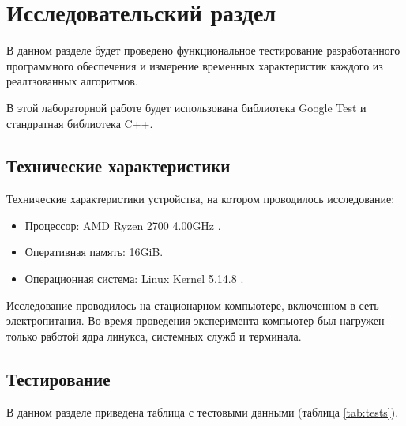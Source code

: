 \chapter{Исследовательский раздел}
В данном разделе будет проведено функциональное тестирование разработанного программного обеспечения и измерение временных характеристик каждого из реалтзованных алгоритмов.

В этой лабораторной работе будет использована библиотека Google Test и стандратная библиотека C++. 

\section{Технические характеристики}

Технические характеристики устройства, на котором проводилось исследование:

\begin{itemize}
    \item Процессор: AMD Ryzen 2700 4.00GHz \cite{ryzen}.
    \item Оперативная память: 16GiB.
    \item Операционная система: Linux Kernel 5.14.8 \cite{kernel}.
\end{itemize}

Исследование проводилось на стационарном компьютере, включенном в сеть электропитания. Во время проведения эксперимента компьютер был нагружен только работой ядра линукса, системных служб и терминала. 

\section{Тестирование}

В данном разделе приведена таблица с тестовыми данными (таблица \ref{tab:tests}).



